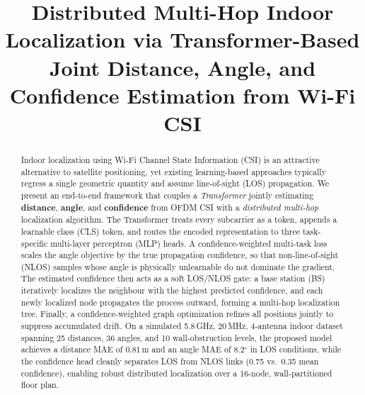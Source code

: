 \documentclass[conference]{IEEEtran}
\begin{document}
\title{Distributed Multi-Hop Indoor Localization via Transformer-Based Joint Distance, Angle, and Confidence Estimation from Wi-Fi CSI}

\author{
}


\maketitle

\begin{abstract}
Indoor localization using Wi-Fi Channel State Information (CSI) is an attractive
alternative to satellite positioning, yet existing learning-based approaches
typically regress a single geometric quantity and assume line-of-sight (LOS)
propagation. We present an end-to-end framework that couples a
\textit{Transformer} jointly estimating \textbf{distance}, \textbf{angle}, and
\textbf{confidence} from OFDM CSI with a \textit{distributed multi-hop}
localization algorithm. The Transformer treats every subcarrier as a token,
appends a learnable class (CLS) token, and routes the encoded representation to
three task-specific multi-layer perceptron (MLP) heads. A confidence-weighted
multi-task loss scales the angle objective by the true propagation confidence,
so that non-line-of-sight (NLOS) samples whose angle is physically unlearnable
do not dominate the gradient. The estimated confidence then acts as a soft
LOS/NLOS gate: a base station (BS) iteratively localizes the neighbour with the
highest predicted confidence, and each newly localized node propagates the
process outward, forming a multi-hop localization tree. Finally, a
confidence-weighted graph optimization refines all positions jointly to
suppress accumulated drift. On a simulated 5.8\,GHz, 20\,MHz, 4-antenna indoor
dataset spanning 25 distances, 36 angles, and 10 wall-obstruction levels, the
proposed model achieves a distance MAE of 0.81\,m and an angle MAE of 8.2$^\circ$
in LOS conditions, while the confidence head cleanly separates LOS from NLOS
links (0.75 vs.\ 0.35 mean confidence), enabling robust distributed
localization over a 16-node, wall-partitioned floor plan.
\end{abstract}
\end{document}

